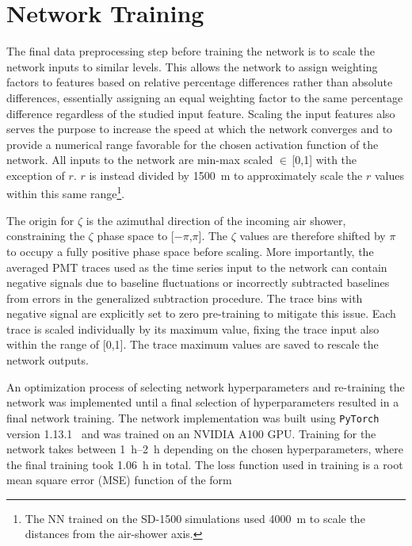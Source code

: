
\section{Network Training}\label{sec:training}
The final data preprocessing step before training the network is to scale the network inputs to similar levels.
This allows the network to assign weighting factors to features based on relative percentage differences rather than absolute differences, essentially assigning an equal weighting factor to the same percentage difference regardless of the studied input feature.
Scaling the input features also serves the purpose to increase the speed at which the network converges and to provide a numerical range favorable for the chosen activation function of the network.
All inputs to the network are min-max scaled $\in$\,[0,1] with the exception of $r$.
$r$ is instead divided by \qty{1500}{\meter} to approximately scale the $r$ values within this same range\footnote[3]{The NN trained on the SD-1500 simulations used \qty{4000}{\meter} to scale the distances from the air-shower axis.}.

The origin for $\zeta$ is the azimuthal direction of the incoming air shower, constraining the $\zeta$ phase space to [$-\pi$,$\pi$].
The $\zeta$ values are therefore shifted by $\pi$ to occupy a fully positive phase space before scaling.
More importantly, the averaged PMT traces used as the time series input to the network can contain negative signals due to baseline fluctuations or incorrectly subtracted baselines from errors in the generalized subtraction procedure.
The trace bins with negative signal are explicitly set to zero pre-training to mitigate this issue.
Each trace is scaled individually by its maximum value, fixing the trace input also within the range of [0,1].
The trace maximum values are saved to rescale the network outputs.

An optimization process of selecting network hyperparameters and re-training the network was implemented until a final selection of hyperparameters resulted in a final network training.
The network implementation was built using \texttt{PyTorch} version 1.13.1~\cite{pytorch_neurips2019} and was trained on an NVIDIA A100 GPU.
Training for the network takes between \qtyrange{1}{2}{\hour} depending on the chosen hyperparameters, where the final training took \qty{1.06}{\hour} in total.
The loss function used in training is a root mean square error (MSE) function of the form

